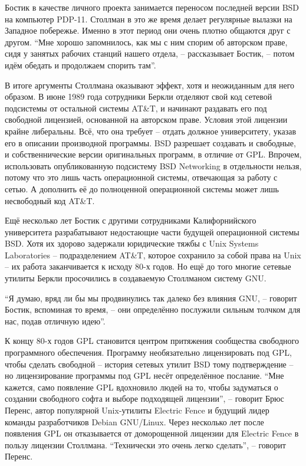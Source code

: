 Бостик в качестве личного проекта занимается переносом последней версии BSD на компьютер PDP-11. Столлман в это же время делает регулярные вылазки на Западное побережье. Именно в этот период они очень плотно общаются друг с другом. ``Мне хорошо запомнилось, как мы с ним спорим об авторском праве, сидя у занятых рабочих станций нашего отдела, -- рассказывает Бостик, -- потом идём обедать и продолжаем спорить там''.

В итоге аргументы Столлмана оказывают эффект, хотя и неожиданным для него образом. В июне 1989 года сотрудники Беркли отделяют свой код сетевой подсистемы от остальной системы AT\&T, и начинают раздавать его под свободной лицензией, основанной на авторском праве. Условия этой лицензии крайне либеральны. Всё, что она требует -- отдать должное университету, указав его в описании производной программы.  BSD разрешает создавать и свободные, и собственнические версии оригинальных программ, в отличие от GPL. Впрочем, использовать опубликованную подсистему BSD Networking в отдельности нельзя, потому что это лишь часть операционной системы, отвечающая за работу с сетью. А дополнить её до полноценной операционной системы может лишь несвободный код AT\&T.

Ещё несколько лет Бостик с другими сотрудниками Калифорнийского университета разрабатывают недостающие части будущей операционной системы BSD. Хотя их здорово задержали юридические тяжбы с Unix Systems Laboratories -- подразделением AT\&T, которое сохранило за собой права на Unix -- их работа заканчивается к исходу 80-х годов. Но ещё до того многие сетевые утилиты Беркли просочились в создаваемую Столлманом систему GNU.

``Я думаю, вряд ли бы мы продвинулись так далеко без влияния GNU, -- говорит Бостик, вспоминая то время, -- они определённо послужили сильным толчком для нас, подав отличную идею''.

К концу 80-х годов GPL становится центром притяжения сообщества свободного программного обеспечения. Программу необязательно лицензировать под GPL, чтобы сделать свободной -- история сетевых утилит BSD тому подтверждение -- но лицензирование программы под GPL несёт определённое послание. ``Мне кажется, само появление GPL вдохновило людей на то, чтобы задуматься о создании свободного софта и выборе подходящей лицензии'', -- говорит Брюс Перенс, автор популярной Unix-утилиты Electric Fence и будущий лидер команды разработчиков Debian GNU/Linux. Через несколько лет после появления GPL он отказывается от доморощенной лицензии для Electric Fence в пользу лицензии Столлмана. ``Технически это очень легко сделать'', -- говорит Перенс.

